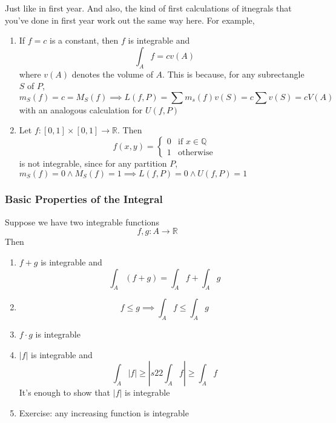 \documentclass{article}
\newcommand{\reals}[0]{\mathbb{R}}
\newcommand{\rationals}[0]{\mathbb{Q}}
\begin{document}
Just like in first year. And also, the kind of first calculations of itnegrals that you've done in first year work out the same way here. For example,
\begin{enumerate}

  \item If \(f = c\) is a constant, then \(f\) is integrable and
  \begin{equation}\int_Af = cv(A)\end{equation}
  where \(v(A)\) denotes the volume of \(A\). This is because, for any subrectangle \(S\) of \(P\),
  \begin{equation}m_S(f) = c = M_S(f) \implies L(f, P) = \sum m_s(f)v(S) = c\sum v(S) = cV(A)\end{equation}
  with an analogous calculation for \(U(f, P)\)

  \item Let \(f: [0, 1] \times [0, 1] \to \reals\). Then
  \begin{equation}f(x, y) = \left\{\begin{array}{cc}
    0 & \text{if } x \in \rationals \\
    1 & \text{otherwise}
  \end{array}\right.\end{equation}
  is not integrable, since for any partition \(P\),
  \(m_S(f) = 0 \land M_S(f) = 1 \implies L(f, P) = 0 \land U(f, P) = 1\)

\end{enumerate}

\subsubsection{Basic Properties of the Integral}

Suppose we have two integrable functions
\begin{equation}f, g: A \to \reals\end{equation}
Then
\begin{enumerate}

  \item \(f + g\) is integrable and
  \begin{equation}\int_A(f + g) = \int_Af + \int_Ag\end{equation}

  \item \begin{equation}f \leq g \implies \int_Af \leq \int_Ag\end{equation}

  \item \(f \cdot g\) is integrable

  \item \(|f|\) is integrable and \begin{equation}
  \int_A|f| \geq \left|s22\int_Af\right| \geq \int_Af\end{equation}
  It's enough to show that \(|f|\) is integrable

  \item Exercise: any increasing function is integrable

\end{enumerate}
\end{document}
